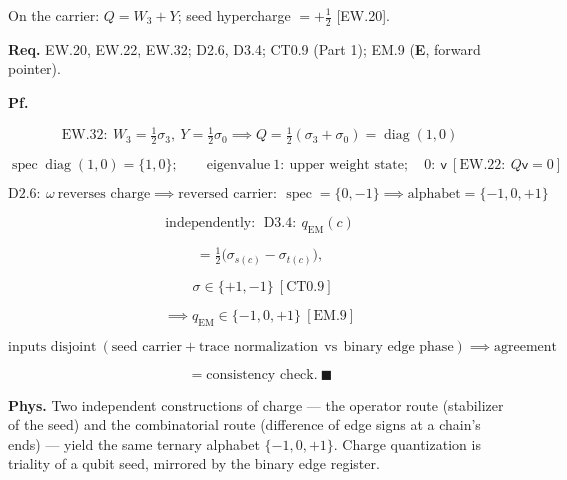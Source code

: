 \begin{corollary}[{\texorpdfstring{EW.36a}{EW.36a}}]\label{tag:EW-36a}
On the carrier: $Q=W_3+Y$; seed hypercharge $=+\tfrac12$ [EW.20].

\textbf{Req.} EW.20, EW.22, EW.32; D2.6, D3.4; CT0.9 (Part 1); EM.9 (\textbf{E}, forward pointer).

\textbf{Pf.}

\[
\mathrm{EW.32}:\ W_3=\tfrac12\sigma_3,\ Y=\tfrac12\sigma_0\implies Q=\tfrac12(\sigma_3+\sigma_0)=\operatorname{diag}(1,0)
\]

\[
\operatorname{spec}\operatorname{diag}(1,0)=\{1,0\};\qquad\text{eigenvalue}\ 1:\ \text{upper weight state};\quad0:\ \mathsf v\ [\mathrm{EW.22}:\ Q\mathsf v=0]
\]

\[
\mathrm{D2.6}:\ \omega\ \text{reverses charge}\implies\text{reversed carrier}:\ \operatorname{spec}=\{0,-1\}\implies\text{alphabet}=\{-1,0,+1\}
\]

\[
\text{independently}:\ \ \mathrm{D3.4}:\ q_{\mathrm{EM}}(c)
\]

\[
= \tfrac12\bigl(\sigma_{s(c)}-\sigma_{t(c)}\bigr),
\]

\[
\ \ \sigma\in\{+1,-1\}\ [\mathrm{CT0.9}]
\]

\[
\implies q_{\mathrm{EM}}\in\{-1,0,+1\}\ [\mathrm{EM.9}]
\]

\[
\text{inputs disjoint}\ (\text{seed carrier}+\text{trace normalization}\ \ \text{vs}\ \ \text{binary edge phase})\implies\text{agreement}
\]

\[
= \text{consistency check}.\ \blacksquare
\]

\textbf{Phys.} Two independent constructions of charge — the operator route (stabilizer of the seed) and the combinatorial route (difference of edge signs at a chain’s ends) — yield the same ternary alphabet $\{-1,0,+1\}$. Charge quantization is triality of a qubit seed, mirrored by the binary edge register.

\end{corollary}


